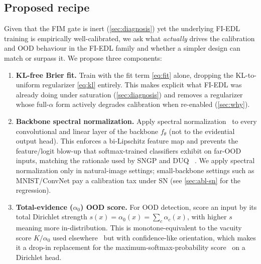 \documentclass[review,5p,times]{elsarticle}
\begin{document}
\subsection{Proposed recipe}\label{sec:recipe}
Given that the FIM gate is inert (\autoref{sec:diagnosis}) yet the underlying
FI-EDL training is empirically well-calibrated, we ask what \emph{actually}
drives the calibration and OOD behaviour in the FI-EDL family and whether a
simpler design can match or surpass it. We propose three components:

\begin{enumerate}
  \item[\textbf{(i)}] \textbf{KL-free Brier fit.} Train with the fit term
    \eqref{eq:fit} alone, dropping the KL-to-uniform regularizer
    \eqref{eq:kl} entirely. This makes explicit what FI-EDL was already doing
    under saturation (\autoref{sec:diagnosis}) and removes a regularizer whose
    full-$\alpha$ form actively degrades calibration when re-enabled
    (\autoref{sec:why}).
  \item[\textbf{(ii)}] \textbf{Backbone spectral normalization.} Apply
    spectral normalization~\citep{miyato2018sngan} to every convolutional and
    linear layer of the backbone $f_\theta$ (not to the evidential output
    head). This enforces a bi-Lipschitz feature map and prevents the
    feature/logit blow-up that softmax-trained classifiers exhibit on far-OOD
    inputs, matching the rationale used by SNGP and DUQ
    ~\citep{liu2020sngp,vanamersfoort2020duq}. We apply spectral
    normalization only in natural-image settings; small-backbone settings
    such as MNIST/ConvNet pay a calibration tax under SN (see
    \autoref{sec:abl-sn} for the regression).
  \item[\textbf{(iii)}] \textbf{Total-evidence ($\alpha_0$) OOD score.} For
    OOD detection, score an input by its total Dirichlet strength
    $s(x)=\alpha_0(x)=\sum_c \alpha_c(x)$, with higher $s$ meaning more
    in-distribution. This is monotone-equivalent to the vacuity score
    $K/\alpha_0$ used elsewhere~\citep{sensoy2018edl} but with
    confidence-like orientation, which makes it a drop-in replacement for the
    maximum-softmax-probability score~\citep{hendrycks2017baseline} on a
    Dirichlet head.
\end{enumerate}
\end{document}
